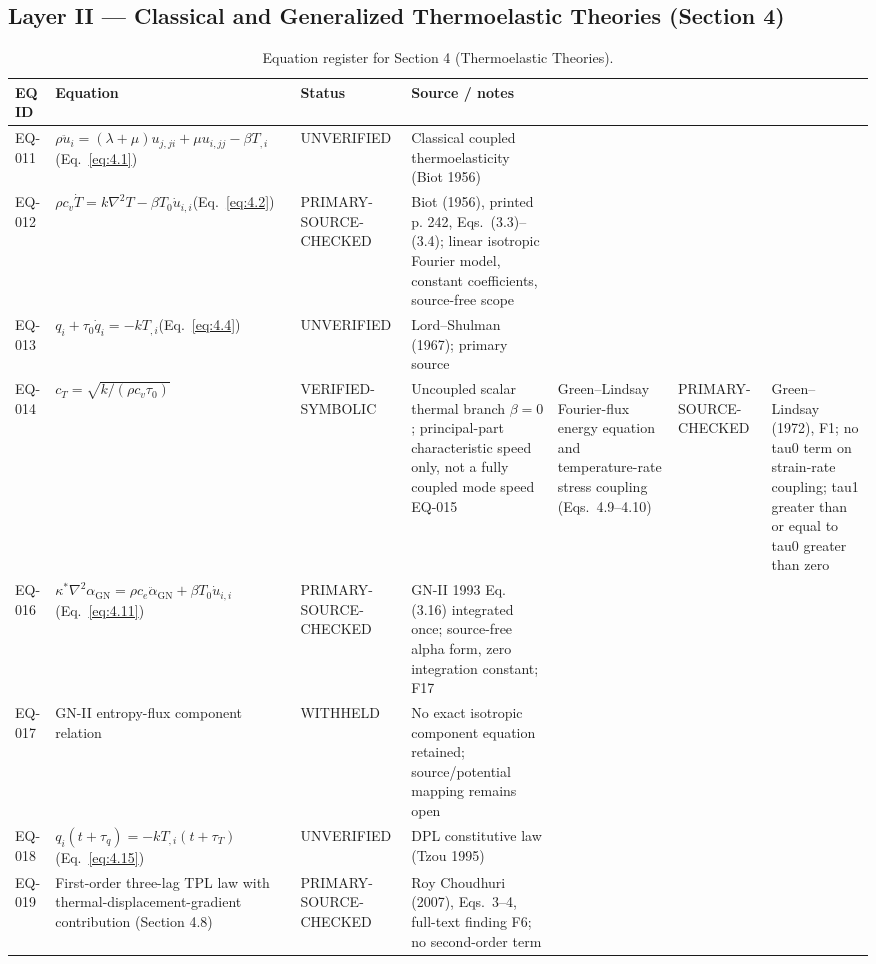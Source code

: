 \subsection{Layer II — Classical and Generalized Thermoelastic Theories (Section 4)}

\begin{table}[htbp]
\centering
\small
\setlength{\tabcolsep}{3pt}
\caption{Equation register for Section 4 (Thermoelastic Theories).}
\label{tab:appA-sec4}
\begin{tabularx}{\textwidth}{@{}p{1.6cm}Y p{2.8cm}Y@{}}
\toprule
\textbf{EQ ID} & \textbf{Equation} & \textbf{Status} & \textbf{Source / notes} \\
\midrule
EQ-011 & $\rho\ddot{u}_i = (\lambda+\mu)u_{j,ji} + \mu u_{i,jj} - \beta T_{,i}$\;(Eq.~\eqref{eq:4.1}) & UNVERIFIED & Classical coupled thermoelasticity (Biot 1956) \\
EQ-012 & $\rho c_v \dot{T} = k\nabla^2 T - \beta T_0 \dot{u}_{i,i}$\;(Eq.~\eqref{eq:4.2}) & PRIMARY-SOURCE-CHECKED & Biot (1956), printed p. 242, Eqs.~(3.3)--(3.4); linear isotropic Fourier model, constant coefficients, source-free scope \\
EQ-013 & $q_i + \tau_0\dot{q}_i = -kT_{,i}$\;(Eq.~\eqref{eq:4.4}) & UNVERIFIED & Lord--Shulman (1967); primary source \\
EQ-014 & $c_T = \sqrt{k/(\rho c_v\tau_0)}$ & VERIFIED-SYMBOLIC & Uncoupled scalar thermal branch $\beta=0$; principal-part characteristic speed only, not a fully coupled mode speed
EQ-015 & Green--Lindsay Fourier-flux energy equation and temperature-rate stress coupling (Eqs.~4.9--4.10) & PRIMARY-SOURCE-CHECKED & Green--Lindsay (1972), F1; no tau0 term on strain-rate coupling; tau1 greater than or equal to tau0 greater than zero \\
EQ-016 & $\kappa^*\nabla^2\alpha_{\mathrm{GN}} = \rho c_e\ddot{\alpha}_{\mathrm{GN}} + \beta T_0\dot{u}_{i,i}$\;(Eq.~\eqref{eq:4.11}) & PRIMARY-SOURCE-CHECKED & GN-II 1993 Eq. (3.16) integrated once; source-free alpha form, zero integration constant; F17 \\
EQ-017 & GN-II entropy-flux component relation & WITHHELD & No exact isotropic component equation retained; source/potential mapping remains open \\
EQ-018 & $q_i(t+\tau_q) = -kT_{,i}(t+\tau_T)$\;(Eq.~\eqref{eq:4.15}) & UNVERIFIED & DPL constitutive law (Tzou 1995) \\
EQ-019 & First-order three-lag TPL law with thermal-displacement-gradient contribution (Section 4.8) & PRIMARY-SOURCE-CHECKED & Roy Choudhuri (2007), Eqs.~3--4, full-text finding F6; no second-order term \\

\end{tabularx}
\end{table}
